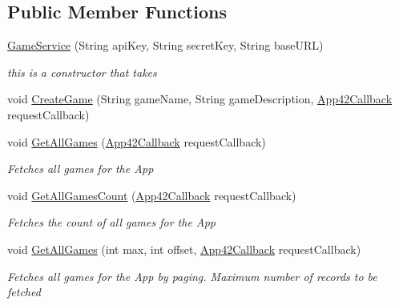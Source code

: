 \subsection*{Public Member Functions}
\begin{DoxyCompactItemize}
\item 
\hyperlink{classcom_1_1shephertz_1_1app42_1_1paas_1_1sdk_1_1windows_1_1game_1_1_game_service_afbed8c98357d67ddf07b4821a6bbd2bc}{Game\+Service} (String api\+Key, String secret\+Key, String base\+U\+R\+L)
\begin{DoxyCompactList}\small\item\em this is a constructor that takes \end{DoxyCompactList}\item 
void \hyperlink{classcom_1_1shephertz_1_1app42_1_1paas_1_1sdk_1_1windows_1_1game_1_1_game_service_ae5ca141a141c2639f25380a30f2d0de4}{Create\+Game} (String game\+Name, String game\+Description, \hyperlink{interfacecom_1_1shephertz_1_1app42_1_1paas_1_1sdk_1_1windows_1_1_app42_callback}{App42\+Callback} request\+Callback)
\item 
void \hyperlink{classcom_1_1shephertz_1_1app42_1_1paas_1_1sdk_1_1windows_1_1game_1_1_game_service_ab98f0d866ba4311d4e0c37028d93053a}{Get\+All\+Games} (\hyperlink{interfacecom_1_1shephertz_1_1app42_1_1paas_1_1sdk_1_1windows_1_1_app42_callback}{App42\+Callback} request\+Callback)
\begin{DoxyCompactList}\small\item\em Fetches all games for the App \end{DoxyCompactList}\item 
void \hyperlink{classcom_1_1shephertz_1_1app42_1_1paas_1_1sdk_1_1windows_1_1game_1_1_game_service_a0c7cc946ff3c542d678ca1a2d2a6d6a1}{Get\+All\+Games\+Count} (\hyperlink{interfacecom_1_1shephertz_1_1app42_1_1paas_1_1sdk_1_1windows_1_1_app42_callback}{App42\+Callback} request\+Callback)
\begin{DoxyCompactList}\small\item\em Fetches the count of all games for the App \end{DoxyCompactList}\item 
void \hyperlink{classcom_1_1shephertz_1_1app42_1_1paas_1_1sdk_1_1windows_1_1game_1_1_game_service_adb06c0436bd80f32b4580c7222ca9b58}{Get\+All\+Games} (int max, int offset, \hyperlink{interfacecom_1_1shephertz_1_1app42_1_1paas_1_1sdk_1_1windows_1_1_app42_callback}{App42\+Callback} request\+Callback)
\begin{DoxyCompactList}\small\item\em Fetches all games for the App by paging. Maximum number of records to be fetched \end{DoxyCompactList}\item 

\end{DoxyCompactItemize}
